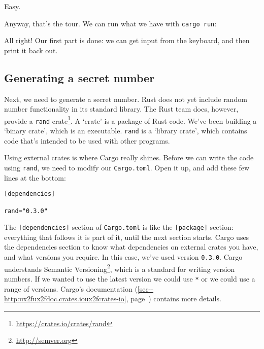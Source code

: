 \documentclass[a4paper,]{book}
\renewcommand*{\hyperref}[2][\ar]{%
  \def\ar{#2}%
  #2 (\autoref{#1}, page~\pageref{#1})}
\newenvironment{Shaded}{\begin{snugshade}}{\end{snugshade}}
\newcommand{\KeywordTok}[1]{\textcolor[rgb]{0.13,0.29,0.53}{\textbf{{#1}}}}
\newcommand{\NormalTok}[1]{{#1}}
\renewcommand{\href}[2]{#2\footnote{\url{#1}}}
\begin{document}
Easy.

Anyway, that's the tour. We can run what we have with
\texttt{cargo\ run}:

\begin{Shaded}
\end{Shaded}

All right! Our first part is done: we can get input from the keyboard,
and then print it back out.

\subsection{Generating a secret
number}\label{generating-a-secret-number}

Next, we need to generate a secret number. Rust does not yet include
random number functionality in its standard library. The Rust team does,
however, provide a \href{https://crates.io/crates/rand}{\texttt{rand}
crate}. A `crate' is a package of Rust code. We've been building a
`binary crate', which is an executable. \texttt{rand} is a `library
crate', which contains code that's intended to be used with other
programs.

Using external crates is where Cargo really shines. Before we can write
the code using \texttt{rand}, we need to modify our \texttt{Cargo.toml}.
Open it up, and add these few lines at the bottom:

\begin{verbatim}
[dependencies]

rand="0.3.0"
\end{verbatim}

The \texttt{{[}dependencies{]}} section of \texttt{Cargo.toml} is like
the \texttt{{[}package{]}} section: everything that follows it is part
of it, until the next section starts. Cargo uses the dependencies
section to know what dependencies on external crates you have, and what
versions you require. In this case, we've used version \texttt{0.3.0}.
Cargo understands \href{http://semver.org}{Semantic Versioning}, which
is a standard for writing version numbers. If we wanted to use the
latest version we could use \texttt{*} or we could use a range of
versions.
\hyperref[sec--http:ux2fux2fdoc.crates.ioux2fcrates-io]{Cargo's
documentation} contains more details.
\end{document}
